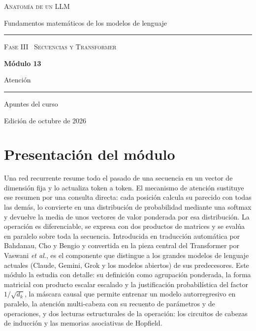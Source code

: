 \documentclass[11pt,a4paper,twoside,openany]{book}
\begin{document}
\frontmatter
\begin{titlepage}
\centering
\vspace*{2.5cm}
{\large\scshape Anatomía de un LLM}\par
\vspace{0.4cm}
{\normalsize Fundamentos matemáticos de los modelos de lenguaje}\par
\vspace{2.2cm}
\rule{\textwidth}{0.8pt}\par\vspace{0.5cm}
{\small\scshape Fase III \textperiodcentered\ Secuencias y Transformer}\par\vspace{0.3cm}
{\Huge\bfseries Módulo 13\par}\vspace{0.3cm}
{\LARGE Atención\par}
\vspace{0.5cm}\rule{\textwidth}{0.4pt}\par
\vspace{1.6cm}
{\large Apuntes del curso}\par
\vfill
{\small Edición de octubre de 2026}\par
\end{titlepage}

\chapter*{Presentación del módulo}

Una red recurrente resume todo el pasado de una secuencia en un vector de dimensión fija y lo actualiza token a token. El mecanismo de atención sustituye ese resumen por una consulta directa: cada posición calcula su parecido con todas las demás, lo convierte en una distribución de probabilidad mediante una softmax y devuelve la media de unos vectores de valor ponderada por esa distribución. La operación es diferenciable, se expresa con dos productos de matrices y se evalúa en paralelo sobre toda la secuencia. Introducida en traducción automática por Bahdanau, Cho y Bengio y convertida en la pieza central del Transformer por Vaswani \emph{et al.}, es el componente que distingue a los grandes modelos de lenguaje actuales (Claude, Gemini, Grok y los modelos abiertos) de sus predecesores. Este módulo la estudia con detalle: su definición como agrupación ponderada, la forma matricial con producto escalar escalado y la justificación probabilística del factor $1/\sqrt{d_k}$, la máscara causal que permite entrenar un modelo autorregresivo en paralelo, la atención multi-cabeza con su recuento de parámetros y de operaciones, y dos lecturas estructurales de la operación: los circuitos de cabezas de inducción y las memorias asociativas de Hopfield.
\end{document}
